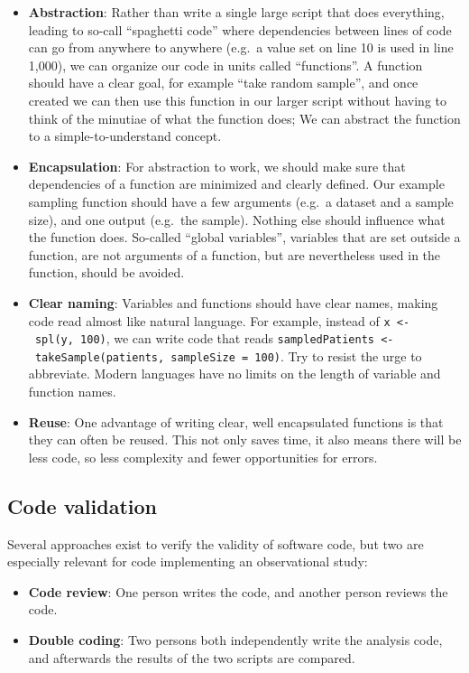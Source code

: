 \documentclass[11pt]{book}
\providecommand{\tightlist}{%
  \setlength{\itemsep}{0pt}\setlength{\parskip}{0pt}}
\theoremstyle{definition}
\theoremstyle{definition}
\theoremstyle{definition}
\theoremstyle{remark}
\begin{document}
\begin{itemize}
\tightlist
\item
  \textbf{Abstraction}: Rather than write a single large script that does everything, leading to so-call ``spaghetti code'' where dependencies between lines of code can go from anywhere to anywhere (e.g.~a value set on line 10 is used in line 1,000), we can organize our code in units called ``functions''. A function should have a clear goal, for example ``take random sample'', and once created we can then use this function in our larger script without having to think of the minutiae of what the function does; We can abstract the function to a simple-to-understand concept.
\item
  \textbf{Encapsulation}: For abstraction to work, we should make sure that dependencies of a function are minimized and clearly defined. Our example sampling function should have a few arguments (e.g.~a dataset and a sample size), and one output (e.g.~the sample). Nothing else should influence what the function does. So-called ``global variables'', variables that are set outside a function, are not arguments of a function, but are nevertheless used in the function, should be avoided.
\item
  \textbf{Clear naming}: Variables and functions should have clear names, making code read almost like natural language. For example, instead of \texttt{x\ \textless{}-\ spl(y,\ 100)}, we can write code that reads \texttt{sampledPatients\ \textless{}-\ takeSample(patients,\ sampleSize\ =\ 100)}. Try to resist the urge to abbreviate. Modern languages have no limits on the length of variable and function names.
\item
  \textbf{Reuse}: One advantage of writing clear, well encapsulated functions is that they can often be reused. This not only saves time, it also means there will be less code, so less complexity and fewer opportunities for errors.
\end{itemize}

\hypertarget{code-validation}{%
\subsection{Code validation}\label{code-validation}}

Several approaches exist to verify the validity of software code, but two are especially relevant for code implementing an observational study:

\begin{itemize}
\tightlist
\item
  \textbf{Code review}: One person writes the code, and another person reviews the code.
\item
  \textbf{Double coding}: Two persons both independently write the analysis code, and afterwards the results of the two scripts are compared.
\end{itemize}
\end{document}
